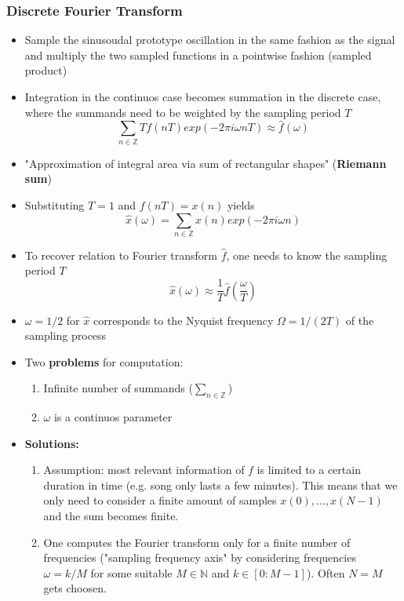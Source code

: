 \documentclass{scrartcl}
\newcommand{\ffrac}[2]{\ensuremath{\frac{\displaystyle #1}{\displaystyle #2}}}
\begin{document}
\subsubsection*{Discrete Fourier Transform}
\begin{itemize}
    \item
        Sample the sinusoudal prototype oscillation in the same fashion as the signal and multiply the two sampled functions in a pointwise fashion (sampled product)
    \item
        Integration in the continuos case becomes summation in the discrete case, where the summands need to be weighted by the sampling period $T$
        $$\sum_{n \in \mathbb{Z}} T f(nT) exp(-2\pi i \omega n T) \approx \hat{f}(\omega)$$
    \item
        "Approximation of integral area via sum of rectangular shapes" (\textbf{Riemann sum})
    \item
        Substituting $T = 1$ and $f(nT) = x(n)$ yields
        $$ \hat{x}(\omega) = \sum_{n \in \mathbb{Z}} x(n) exp(-2\pi i \omega n) $$
    \item
        To recover relation to Fourier transform $\hat{f}$, one needs to know the sampling period $T$
        $$ \hat{x}(\omega) \approx \ffrac{1}{T} \hat{f}(\ffrac{\omega}{T})$$
    \item
        $\omega = 1/2$ for $\hat{x}$ corresponds to the Nyquist frequency $\Omega = 1/(2T)$ of the sampling process
    \item
        Two \textbf{problems} for computation: 
        \begin{enumerate}
            \item
                Infinite number of summands ($\sum_{n \in \mathbb{Z}}$)
            \item
                $\omega$ is a continuos parameter
        \end{enumerate}
    \item
        \textbf{Solutions:}
        \begin{enumerate}
            \item
                Assumption: most relevant information of $f$ is limited to a certain duration in time (e.g. song only lasts a few minutes). This means that we only need to consider a finite amount of samples $x(0),\dots,x(N-1)$ and the sum becomes finite.
            \item
                One computes the Fourier transform only for a finite number of frequencies ("sampling frequency axis" by considering frequencies $\omega = k/M$ for some suitable $M \in \mathbb{N}$ and $k \in [0: M-1]$). Often $N=M$ gets choosen.

\end{enumerate}
\end{itemize}
\end{document}
